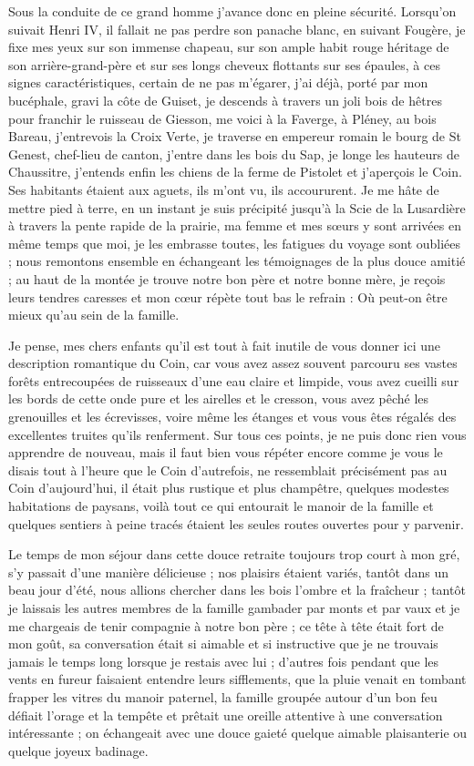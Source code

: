 \documentclass[11pt,a4paper]{report}
\begin{document}
Sous la conduite de ce grand homme j'avance donc en pleine sécurité. Lorsqu'on suivait Henri IV, il fallait ne pas perdre son panache blanc, en suivant Fougère, je fixe mes yeux sur son immense chapeau, sur son ample habit rouge héritage de son arrière-grand-père et sur ses longs cheveux flottants sur ses épaules, à ces signes caractéristiques, certain de ne pas m'égarer, j'ai déjà, porté par mon bucéphale, gravi la côte de Guiset, je descends à travers un joli bois de hêtres pour franchir le ruisseau de Giesson, me voici à la Faverge, à Pléney, au bois Bareau, j'entrevois la Croix Verte, je traverse en empereur romain le bourg de St Genest, chef-lieu de canton, j'entre dans les bois du Sap, je longe les hauteurs de Chaussitre, j'entends enfin les chiens de la ferme de Pistolet et j'aperçois le Coin. Ses habitants étaient aux aguets, ils m'ont vu, ils accoururent. Je me hâte de mettre pied à terre, en un instant je suis précipité jusqu'à la Scie de la Lusardière à travers la pente rapide de la prairie, ma femme et mes sœurs y sont arrivées en même temps que moi, je les embrasse toutes, les fatigues du voyage sont oubliées ; nous remontons ensemble en échangeant les témoignages de la plus douce amitié ; au haut de la montée je trouve notre bon père et notre bonne mère, je reçois leurs tendres caresses et mon cœur répète tout bas le refrain : Où peut-on être mieux qu'au sein de la famille.

Je pense, mes chers enfants qu'il est tout à fait inutile de vous donner ici une description romantique du Coin, car vous avez assez souvent parcouru ses vastes forêts entrecoupées de ruisseaux d'une eau claire et limpide, vous avez cueilli sur les bords de cette onde pure et les airelles et le cresson, vous avez pêché les grenouilles et les écrevisses, voire même les étanges et vous vous êtes régalés des excellentes truites qu'ils renferment. Sur tous ces points, je ne puis donc rien vous apprendre de nouveau, mais il faut bien vous répéter encore comme je vous le disais tout à l'heure que le Coin d'autrefois, ne ressemblait précisément pas au Coin d'aujourd'hui, il était plus rustique et plus champêtre, quelques modestes habitations de paysans, voilà tout ce qui entourait le manoir de la famille et quelques sentiers à peine tracés étaient les seules routes ouvertes pour y parvenir.

Le temps de mon séjour dans cette douce retraite toujours trop court à mon gré, s'y passait d'une manière délicieuse ; nos plaisirs étaient variés, tantôt dans un beau jour d'été, nous allions chercher dans les bois l'ombre et la fraîcheur ; tantôt je laissais les autres membres de la famille gambader par monts et par vaux et je me chargeais de tenir compagnie à notre bon père ; ce tête à tête était fort de mon goût, sa conversation était si aimable et si instructive que je ne trouvais jamais le temps long lorsque je restais avec lui ; d'autres fois pendant que les vents en fureur faisaient entendre leurs sifflements, que la pluie venait en tombant frapper les vitres du manoir paternel, la famille groupée autour d'un bon feu défiait l'orage et la tempête et prêtait une oreille attentive à une conversation intéressante ; on échangeait avec une douce gaieté quelque aimable plaisanterie ou quelque joyeux badinage.
\end{document}
